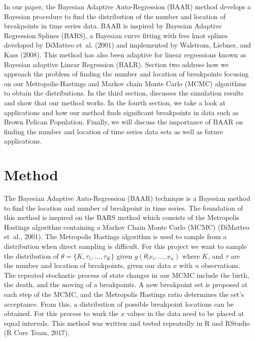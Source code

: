\documentclass[submit]{smj}
\begin{document}
      In our paper, the Bayesian Adaptive Auto-Regression (BAAR) method develops a Bayesian procedure to find the distribution of the number and location of breakpoints in time series data. BAAR is inspired by Bayesian Adaptive Regression Splines (BARS), a Bayesian curve fitting with free knot splines developed by DiMatteo et~al. (2001) and implemented by Walstrom, Liebner, and Kass (2008). This method has also been adaptive for linear regressions known as Bayesian adaptive Linear Regression (BALR). Section two address how we approach the problem of finding the number and location of breakpoints focusing on our Metropolis-Hastings and Markov chain Monte Carlo (MCMC) algorithms to obtain the distributions. In the third section, discusses the simulation results and show that our method works. In the fourth section, we take a look at applications and how our method finds significant breakpoints in data such as Brown Pelican Population. Finally, we will discuss the importance of BAAR on finding the number and location of time series data sets as well as future applications. 

\section{Method}
The Bayesian Adaptive Auto-Regression (BAAR) technique is a Bayesian method to find the location and number of breakpoint in time series. The foundation of this method is inspired on the BARS method which consists of the Metropolis Hastings algorithm containing a Markov Chain Monte Carlo (MCMC) (DiMatteo et~al., 2001). The Metropolis Hastings algorithm is used to sample from a distribution when direct sampling is difficult. For this project we want to sample the distribution of $\theta = \{K, \tau_1, \dots, \tau_K \}$ given $g(\theta | x_i, \dots , x_n)$ where $K$, and $\tau$ are the number and location of breakpoints, given our data $x$ with $n$ observations. The repeated stochastic process of state changes in our MCMC include the birth, the death, and the moving of a breakpoints. A new breakpoint set is proposed at each step of the MCMC, and the Metropolis Hastings ratio determines the set's acceptance. From this, a distribution of possible breakpoint locations can be obtained. For this process to work the $x$ values in the data need to be placed at equal intervals. This method was written and tested repeatedly in R and RStudio (R Core Team, 2017). 
\end{document}
